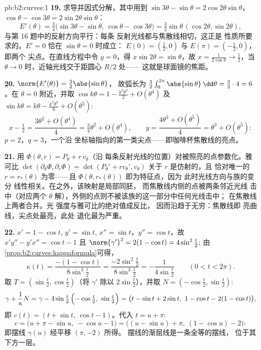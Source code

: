 \begin{solution}{pb:b2:curves:1}
\textbf{19.} 求导并因式分解，其中用到 $\sin3\theta
- \sin\theta = 2\cos2\theta\sin\theta$，$\cos\theta -
\cos3\theta = 2\sin2\theta\sin\theta$：
\[
E'(\theta) = \tfrac34\bigl(\sin3\theta - \sin\theta,\
\cos\theta - \cos3\theta\bigr)
= \tfrac32\sin\theta\,(\cos2\theta, \sin2\theta),
\]
与第 16 题中的反射方向平行：每条
反射光线都与焦散线相切，这正是
性质所要求的。$E' = 0$ 恰在 $\sin\theta = 0$ 时成立：
$E(0) = (\tfrac12, 0)$ 与 $E(\pi) = (-\tfrac12, 0)$，即两个
尖点。在直线方程中令 $y = 0$，得 $x\sin2\theta =
\sin\theta$，故 $x = \frac1{2\cos\theta} \to \frac12$，当
$\theta \to 0$ 时，近轴光线交于距圆心 $R/2$ 处——
这就是球面镜的焦距。

\textbf{20.} $\norm{E'(\theta)} = \tfrac32\abs{\sin\theta}$，
故弧长为 $\tfrac32\int_0^{2\pi}\abs{\sin\theta}\,
\dd\theta = \tfrac32\cdot4 = 6$。在 $\theta = 0$ 附近，并取
$\cos k\theta = 1 - \tfrac{k^2\theta^2}2 + O(\theta^4)$ 及
$\sin k\theta = k\theta - \tfrac{k^3\theta^3}6 +
O(\theta^5)$:
\[
x - \tfrac12 = \frac{3\theta^2 + O(\theta^4)}{4}
= \tfrac34\theta^2 + O(\theta^4),
\qquad
y = \frac{4\theta^3 + O(\theta^5)}{4}
= \theta^3 + O(\theta^5) :
\]
$p = 2$，$q = 3$，一个沿
坐标轴指向的第一类尖点——即咖啡杯焦散线的亮点。

\textbf{21.} 用
$\Phi(\theta, r) = P_\theta + r\,v_\theta$（沿
每条反射光线的位置）对被照亮的点参数化。雅可比
$\det(\partial_\theta\Phi, \partial_r\Phi) =
\det(P_\theta' + rv_\theta', v_\theta)$ 关于 $r$ 是仿射的，且
恰对唯一的 $r = r_*(\theta)$ 为零——且
$\Phi(\theta, r_*(\theta))$ 即为特征点，因为
此时光线方向与族的变分
线性相关。在之外，该映射是局部同胚，
而焦散线内侧的点被两条邻近光线
击中（对应两个 $\theta$ 解），外侧的点则不被该族的这一部分中任何光线击中；
在焦散线上两者合并。光
强度与雅可比的绝对值成反比，
因而沿趋于无穷：焦散线即
亮曲线，尖点处最亮，此处
退化最为严重。

\textbf{22.} $x' = 1 - \cos t$, $y' = \sin t$, $x'' = \sin
t$，$y'' = \cos t$，故 $x'y'' - y'x'' = \cos t - 1$ 且
$\norm{\gamma'}^2 = 2(1 - \cos t) = 4\sin^2\tfrac t2$;
由\cref{prop:b2:curves:kappaformula}可得，
\[
\kappa(t) = \frac{-(1 - \cos t)}{8\sin^3\tfrac t2}
= \frac{-2\sin^2\tfrac t2}{8\sin^3\tfrac t2}
= -\frac1{4\sin\tfrac t2}
\qquad (0 < t < 2\pi).
\]
取 $T = (\sin\tfrac t2, \cos\tfrac t2)$（将 $\gamma'$
除以 $2\sin\tfrac t2$），并取 $N = (-\cos\tfrac t2, \sin\tfrac
t2)$:
\[
\gamma + \frac1\kappa N
= \gamma - 4\sin\tfrac t2\,\Bigl(-\cos\tfrac t2,\
\sin\tfrac t2\Bigr)
= \bigl(t - \sin t + 2\sin t,\ 1 - \cos t - 2(1 - \cos
t)\bigr),
\]
即 $c(t) = (t + \sin t,\ \cos t - 1)$。代入 $t = u
+ \pi$:
\[
c = \bigl(u + \pi - \sin u,\ -\cos u - 1\bigr)
= \bigl((u - \sin u) + \pi,\ (1 - \cos u) - 2\bigr) :
\]
即摆线 $\gamma(u)$ 经平移 $(\pi, -2)$ 所得。
摆线的渐屈线是一条全等的摆线，
位于其下方一层。


\end{solution}

